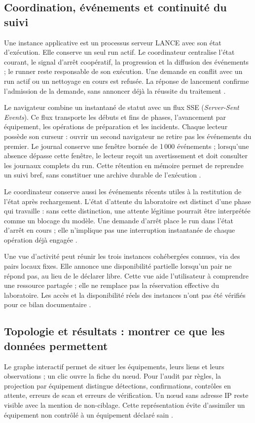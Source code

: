 \documentclass[11pt,a4paper]{article}
\begin{document}
\subsection{Coordination, événements et continuité du suivi}
Une instance applicative est un processus serveur LANCE avec son état
d'exécution. Elle conserve un seul run actif. Le coordinateur centralise
l'état courant, le signal d'arrêt coopératif, la progression et la diffusion des
événements ; le runner reste responsable de son exécution. Une demande en conflit
avec un run actif ou un nettoyage en cours est refusée. La réponse de lancement
confirme l'admission de la demande, sans annoncer déjà la réussite du traitement
\cite{app-coordinator,app-start}.

Le navigateur combine un instantané de statut avec un flux SSE
(\emph{Server-Sent Events}). Ce flux transporte les débuts et fins de phases,
l'avancement par équipement, les opérations de préparation et les incidents.
Chaque lecteur possède son curseur : ouvrir un second navigateur ne retire
pas les événements du premier. Le journal conserve une fenêtre bornée de
1\,000 événements ; lorsqu'une absence dépasse cette fenêtre, le lecteur reçoit
un avertissement et doit consulter les journaux complets du run. Cette rétention
en mémoire permet de reprendre un suivi bref, sans constituer une archive
durable de l'exécution \cite{app-events}.

Le coordinateur conserve aussi les événements récents utiles à la restitution
de l'état après rechargement. L'état d'attente du laboratoire est distinct d'une
phase qui travaille : sans cette distinction, une attente légitime pourrait
être interprétée comme un blocage du modèle. Une demande d'arrêt place le run
dans l'état d'arrêt en cours ; elle n'implique pas une interruption instantanée
de chaque opération déjà engagée \cite{app-coordinator}.

Une vue d'activité peut réunir les trois instances cohébergées connues, via
des pairs locaux fixes. Elle annonce une disponibilité partielle lorsqu'un
pair ne répond pas, au lieu de le déclarer libre. Cette vue aide l'utilisateur
à comprendre une ressource partagée ; elle ne remplace pas la réservation
effective du laboratoire. Les accès et la disponibilité réels des instances
n'ont pas été vérifiés pour ce bilan documentaire \cite{app-activity}.

\subsection{Topologie et résultats : montrer ce que les données permettent}
Le graphe interactif permet de situer les équipements, leurs liens et leurs
observations ; un clic ouvre la fiche du nœud. Pour l'audit par règles,
la projection par équipement distingue détections, confirmations, contrôles en
attente, erreurs de scan et erreurs de vérification. Un nœud sans adresse IP
reste visible avec la mention de non-ciblage. Cette représentation évite
d'assimiler un équipement non contrôlé à un équipement déclaré sain
\cite{app-ui,app-rules-tests}.
\end{document}
